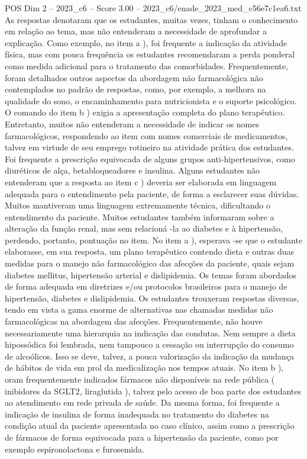 \begin{textsample}{POS Dim 2 – 2023\_c6 – Score 3.00 – 2023\_c6/enade\_2023\_med\_c56e7c1ea6.txt}
As respostas denotaram que os estudantes, muitas vezes, tinham o conhecimento em relação ao tema, mas não entenderam a necessidade de aprofundar a explicação.
Como exemplo, no item a ), foi frequente a indicação da atividade física, mas com pouca frequência os estudantes recomendaram a perda ponderal como medida adicional para o tratamento das comorbidades.
Frequentemente, foram detalhados outros aspectos da abordagem não farmacológica não contemplados no padrão de respostas, como, por exemplo, a melhora na qualidade do sono, o encaminhamento para nutricionista e o suporte psicológico.
O comando do item b ) exigia a apresentação completa do plano terapêutico.
Entretanto, muitos não entenderam a necessidade de indicar os nomes farmacológicos, respondendo ao item com nomes comerciais de medicamentos, talvez em virtude de seu emprego rotineiro na atividade prática dos estudantes.
Foi frequente a prescrição equivocada de alguns grupos anti-hipertensivos, como diuréticos de alça, betabloqueadores e insulina.
Alguns estudantes não entenderam que a resposta ao item c ) deveria ser elaborada em linguagem adequada para o entendimento pela paciente, de forma a esclarecer suas dúvidas.
Muitos mantiveram uma linguagem extremamente técnica, dificultando o entendimento da paciente.
Muitos estudantes também informaram sobre a alteração da função renal, mas sem relacioná -la ao diabetes e à hipertensão, perdendo, portanto, pontuação no item.
No item a ), esperava -se que o estudante elaborasse, em sua resposta, um plano terapêutico contendo dieta e outras duas medidas para o manejo não farmacológico das afecções da paciente, quais sejam diabetes mellitus, hipertensão arterial e dislipidemia.
Os temas foram abordados de forma adequada em diretrizes e/ou protocolos brasileiros para o manejo de hipertensão, diabetes e dislipidemia.
Os estudantes trouxeram respostas diversas, tendo em vista a gama enorme de alternativas nas chamadas medidas não farmacológicas na abordagem das afecções.
Frequentemente, não houve necessariamente uma hierarquia na indicação das condutas.
Nem sempre a dieta hipossódica foi lembrada, nem tampouco a cessação ou interrupção do consumo de alcoólicos.
Isso se deve, talvez, a pouca valorização da indicação da mudança de hábitos de vida em prol da medicalização nos tempos atuais.
No item b ), oram frequentemente indicados fármacos não disponíveis na rede pública ( inibidores da SGLT2, liraglutida ), talvez pelo acesso de boa parte dos estudantes ao atendimento em rede privada de saúde.
Da mesma forma, foi frequente a indicação de insulina de forma inadequada no tratamento do diabetes na condição atual da paciente apresentada no caso clínico, assim como a prescrição de fármacos de forma equivocada para a hipertensão da paciente, como por exemplo espironolactona e furosemida.

\end{textsample}
